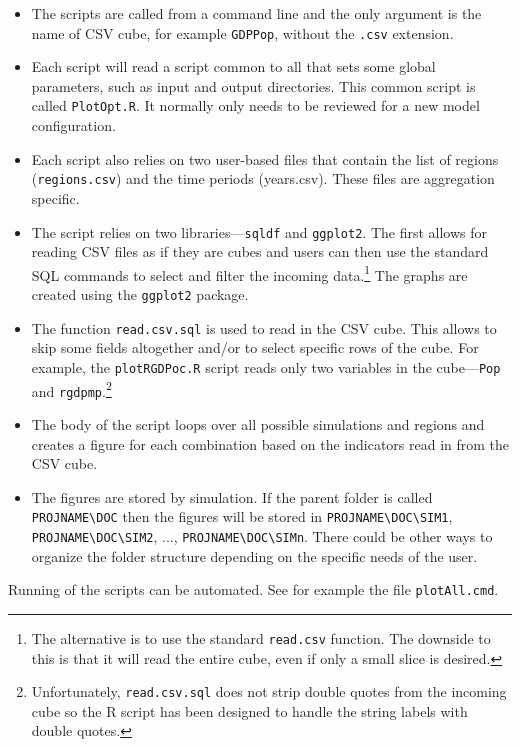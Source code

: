\begin{itemize}
\item The scripts are called from a command line and the only argument is the name of
CSV cube, for example \texttt{GDPPop}, without the \texttt{.csv} extension.
\item Each script will read a script common to all that sets some global parameters,
such as input and output directories. This common script is called \texttt{PlotOpt.R}. It
normally only needs to be reviewed for a new model configuration.
\item Each script also relies on two user-based files that contain the list of regions
(\texttt{regions.csv}) and the time periods (years.csv). These files are aggregation
specific.
\item The script relies on two libraries---\texttt{sqldf} and \texttt{ggplot2}. The first
allows for reading CSV files as if they are cubes and users can then use the standard
SQL commands to select and filter the incoming data.\footnote{The alternative is to use
the standard \texttt{read.csv} function. The downside to this is that it will read the
entire cube, even if only a small slice is desired.} The graphs are created using
the \texttt{ggplot2} package.
\item The function \texttt{read.csv.sql} is used to read in the CSV cube. This
allows to skip some fields altogether and/or to select specific rows of the cube.
For example, the \texttt{plotRGDPoc.R} script reads only two variables in the
cube---\texttt{Pop} and \texttt{rgdpmp}.\footnote{Unfortunately, \texttt{read.csv.sql}
does not strip double quotes from the incoming cube so the R script has been
designed to handle the string labels with double quotes.}
\item The body of the script loops over all possible simulations and regions and
creates a figure for each combination based on the indicators read in from the CSV
cube.
\item The figures are stored by simulation. If the parent folder is called \texttt{PROJNAME\textbackslash{DOC}} then
the figures will be stored in \texttt{PROJNAME\textbackslash{DOC}\textbackslash{SIM1}}, \texttt{PROJNAME\textbackslash{DOC}\textbackslash{SIM2}}, ...,
\texttt{PROJNAME\textbackslash{DOC}\textbackslash{SIMn}}. There could be other ways to organize the folder structure depending
on the specific needs of the user.
\end{itemize}

\noindent Running of the scripts can be automated. See for example the file
\texttt{plotAll.cmd}.




